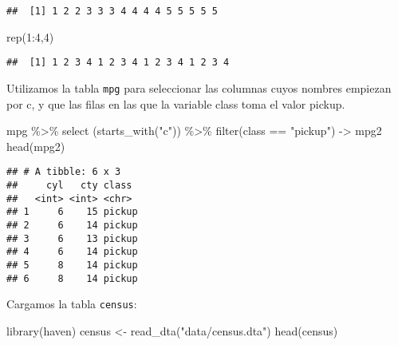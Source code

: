 \documentclass[
]{article}
\newenvironment{Shaded}{\begin{snugshade}}{\end{snugshade}}
\newcommand{\DecValTok}[1]{\textcolor[rgb]{0.00,0.00,0.81}{#1}}
\newcommand{\FunctionTok}[1]{\textcolor[rgb]{0.00,0.00,0.00}{#1}}
\newcommand{\NormalTok}[1]{#1}
\newcommand{\OtherTok}[1]{\textcolor[rgb]{0.56,0.35,0.01}{#1}}
\newcommand{\SpecialCharTok}[1]{\textcolor[rgb]{0.00,0.00,0.00}{#1}}
\newcommand{\StringTok}[1]{\textcolor[rgb]{0.31,0.60,0.02}{#1}}
\begin{document}
\begin{verbatim}
##  [1] 1 2 2 3 3 3 4 4 4 4 5 5 5 5 5
\end{verbatim}

\begin{Shaded}
\begin{Highlighting}[]
\FunctionTok{rep}\NormalTok{(}\DecValTok{1}\SpecialCharTok{:}\DecValTok{4}\NormalTok{,}\DecValTok{4}\NormalTok{)}
\end{Highlighting}
\end{Shaded}

\begin{verbatim}
##  [1] 1 2 3 4 1 2 3 4 1 2 3 4 1 2 3 4
\end{verbatim}

Utilizamos la tabla \texttt{mpg} para seleccionar las columnas cuyos
nombres empiezan por c, y que las filas en las que la variable class
toma el valor pickup.

\begin{Shaded}
\begin{Highlighting}[]
\NormalTok{mpg }\SpecialCharTok{\%\textgreater{}\%} \FunctionTok{select}\NormalTok{ (}\FunctionTok{starts\_with}\NormalTok{(}\StringTok{"c"}\NormalTok{)) }\SpecialCharTok{\%\textgreater{}\%} \FunctionTok{filter}\NormalTok{(class }\SpecialCharTok{==} \StringTok{"pickup"}\NormalTok{) }\OtherTok{{-}\textgreater{}}\NormalTok{ mpg2}
\FunctionTok{head}\NormalTok{(mpg2)}
\end{Highlighting}
\end{Shaded}

\begin{verbatim}
## # A tibble: 6 x 3
##     cyl   cty class 
##   <int> <int> <chr> 
## 1     6    15 pickup
## 2     6    14 pickup
## 3     6    13 pickup
## 4     6    14 pickup
## 5     8    14 pickup
## 6     8    14 pickup
\end{verbatim}

Cargamos la tabla \texttt{census}:

\begin{Shaded}
\begin{Highlighting}[]
\FunctionTok{library}\NormalTok{(haven)}
\NormalTok{census }\OtherTok{\textless{}{-}} \FunctionTok{read\_dta}\NormalTok{(}\StringTok{"data/census.dta"}\NormalTok{)}
\FunctionTok{head}\NormalTok{(census)}
\end{Highlighting}
\end{Shaded}
\end{document}
